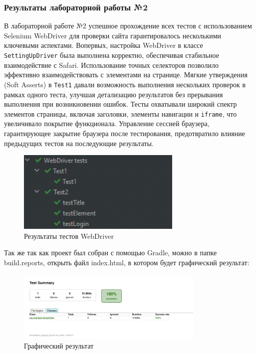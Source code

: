 \documentclass[areasetadvanced]{scrartcl}
\begin{document}
\subsubsection{Результаты лабораторной работы №2}

В лабораторной работе №2 успешное прохождение всех тестов с использованием Selenium WebDriver для проверки сайта гарантировалось несколькими ключевыми аспектами. Вопервых, настройка WebDriver в классе \texttt{SettingUpDriver} была выполнена корректно, обеспечивая стабильное взаимодействие с Safari. Использование точных селекторов позволило эффективно взаимодействовать с элементами на странице. Мягкие утверждения (Soft Asserts) в \texttt{Test1} давали возможность выполнения нескольких проверок в рамках одного теста, улучшая детализацию результатов без прерывания выполнения при возникновении ошибок. Тесты охватывали широкий спектр элементов страницы, включая заголовки, элементы навигации и \texttt{iframe}, что увеличивало покрытие функционала. Управление сессией браузера, гарантирующее закрытие браузера после тестирования, предотвратило влияние предыдущих тестов на последующие результаты.
\begin{figure}[H]
	\centering
	\includegraphics[width=0.7\textwidth]{images/Web.png}
	\caption{Результаты тестов WebDriver}
	\label{fig:syntdiag}
\end{figure}
Так же так как проект был собран с помощью Gradle, можно в папке build.reports, открыть файл index.html, в котором будет графический результат:

\begin{figure}[H]
	\centering
	\includegraphics[width=0.8\textwidth]{images/image.png}
	\caption{Графический результат}
	\label{fig:syntdiag}
\end{figure}
\end{document}
